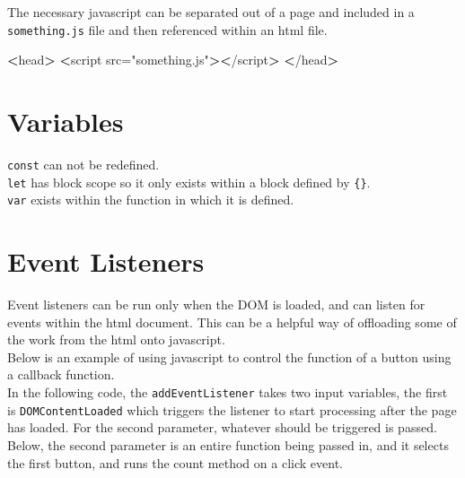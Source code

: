 \documentclass[]{book}
\newenvironment{Shaded}{\begin{snugshade}}{\end{snugshade}}
\newcommand{\ExtensionTok}[1]{#1}
\newcommand{\FunctionTok}[1]{\textcolor[rgb]{0.00,0.00,0.00}{#1}}
\newcommand{\NormalTok}[1]{#1}
\newcommand{\OperatorTok}[1]{\textcolor[rgb]{0.81,0.36,0.00}{\textbf{#1}}}
\newcommand{\StringTok}[1]{\textcolor[rgb]{0.31,0.60,0.02}{#1}}
\begin{document}
The necessary javascript can be separated out of a page and included in a \texttt{something.js} file and then referenced within an html file.

\begin{Shaded}
\begin{Highlighting}[]
\OperatorTok{<}\FunctionTok{head}\OperatorTok{>}                                 
    \OperatorTok{<}\ExtensionTok{script}\NormalTok{ src=}\StringTok{"something.js"}\OperatorTok{><}\NormalTok{/script}\OperatorTok{>}
\OperatorTok{<}\NormalTok{/}\ExtensionTok{head}\OperatorTok{>}                                
\end{Highlighting}
\end{Shaded}

\hypertarget{variables}{%
\section{Variables}\label{variables}}

\texttt{const} can not be redefined.\\
\texttt{let} has block scope so it only exists within a block defined by \texttt{\{\}}.\\
\texttt{var} exists within the function in which it is defined.

\hypertarget{event-listeners}{%
\section{Event Listeners}\label{event-listeners}}

Event listeners can be run only when the DOM is loaded, and can listen for events within the html document. This can be a helpful way of offloading some of the work from the html onto javascript.\\
Below is an example of using javascript to control the function of a button using a callback function.\\
In the following code, the \texttt{addEventListener} takes two input variables, the first is \texttt{DOMContentLoaded} which triggers the listener to start processing after the page has loaded. For the second parameter, whatever should be triggered is passed. Below, the second parameter is an entire function being passed in, and it selects the first button, and runs the count method on a click event.
\end{document}
